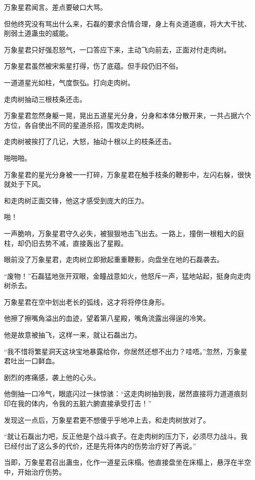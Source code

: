 \begin{this_body}
万象星君闻言。差点要破口大骂。

但他终究没有骂出什么来，石磊的要求合情合理，身上有炎道道痕，将大大干扰、削弱土道蛊虫的威能。

万象星君只好强忍怒气，一口答应下来，主动飞向前去，正面对付走肉树。

万象星君虽然被宋紫星打得，伤了底蕴。但手段仍旧不俗。

一道道星光如柱，气度恢弘。打向走肉树。

走肉树抽动三根枝条还击。

万象星君忽然身躯一晃，晃出五道星光分身，分身和本体分散开来，一共占据六个方位，各自使出不同的星道杀招，围攻走肉树。

走肉树被挨打了几记，大怒，抽动十根以上的枝条还击。

啪啪啪。

万象星君的星光分身被一一打碎，万象星君在触手枝条的鞭影中，左闪右躲，很快就处于下风。

和走肉树正面交锋，他这才感受到庞大的压力。

啪！

一声脆响，万象星君守久必失，被狠狠地击飞出去。一路上，撞倒一根粗大的庭柱，却仍旧去势不减，直接轰出了星殿。

眼前没了万象星君，走肉树立即掀起重重鞭影，向盘坐在地的石磊袭去。

“废物！”石磊猛地张开双眼，金瞳战意如火，他怒斥一声，猛地站起，挺身向走肉树杀去。

万象星君在空中划出老长的弧线，这才将将停住身形。

他擦了擦嘴角溢出的血迹，望着第八星殿，嘴角流露出得逞的冷笑。

他是故意被抽飞，这样一来，就让石磊出力。

“我不惜将繁星洞天这块宝地暴露给你，你居然还想不出力？哇唔。”忽然，万象星君吐出一口鲜血。

剧烈的疼痛感，袭上他的心头。

他倒抽一口冷气，眼底闪过一抹惊骇：“这走肉树抽到我，居然直接将力道道痕刻印在我的体内，令我的五脏六腑直接承受打击！”

发现这一点后，万象星君更不想傻乎乎地冲上去，和走肉树放对了。

“就让石磊出力吧，反正他是个战斗疯子。在走肉树的压力下，必须尽力战斗。我已经付出了这么多的代价，还是先将体内的伤势治疗好了再说。”

当即，万象星君召出蛊虫，化作一道星云床榻。他直接盘坐在床榻上，悬浮在半空中，开始治疗伤势。


\end{this_body}

